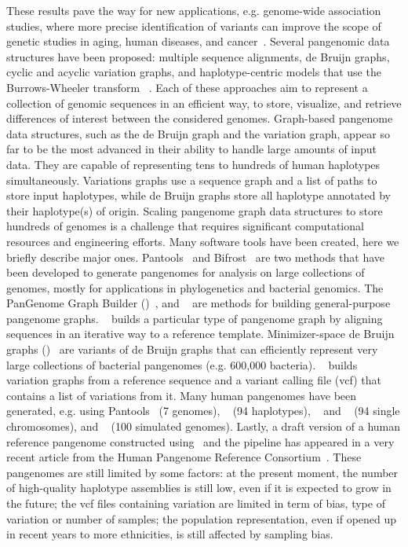 These results pave the way for new applications, e.g. genome-wide association studies, where more precise identification of variants can improve the scope of genetic studies in aging, human diseases, and cancer~\cite{computational_pangenomics, hpp}.
Several pangenomic data structures have been proposed: multiple sequence alignments, de Bruijn graphs, cyclic and acyclic variation graphs, and haplotype-centric models that use the Burrows-Wheeler transform ~\cite{computational_pangenomics}. Each of these approaches aim to represent a collection of genomic sequences in an efficient way, to store, visualize, and retrieve differences of interest between the considered genomes. 
Graph-based pangenome data structures, such as the de Bruijn graph and the variation graph, appear so far to be the most advanced in their ability to handle large amounts of input data. They are capable of representing tens to hundreds of human haplotypes simultaneously. Variations graphs use a sequence graph and a list of paths to store input haplotypes, while de Bruijn graphs store all haplotype \kmers annotated by their haplotype(s) of origin. 
Scaling pangenome graph data structures to store hundreds of genomes is a challenge that requires significant computational resources and engineering efforts. Many software tools have been created, here we briefly describe major ones.
Pantools~\cite{pantools} and Bifrost~\cite{bifrost} are two methods that have been developed to generate pangenomes for analysis on large collections of genomes, mostly for applications in phylogenetics and bacterial genomics. The PanGenome Graph Builder (\pggb)~\cite{pggb}, \mcactus and \twopaco~\cite{twopaco} are methods for building general-purpose pangenome graphs. \minigraph~\cite{minigraph} builds a particular type of pangenome graph by aligning sequences in an iterative way to a reference template. Minimizer-space de Bruijn graphs (\mdbg)~\cite{mdbg} are variants of de Bruijn graphs that can efficiently represent very large collections of bacterial pangenomes (e.g. 600,000 bacteria).  \mbox{\vg}~\mbox{\cite{vg}} builds variation graphs from a reference sequence and a variant calling file (vcf) that contains a list of variations from it.
Many human pangenomes have been generated, e.g. using Pantools~\cite{pantools} (7 genomes),  \minigraph~\cite{minigraph} (94 haplotypes), \mcactus~\cite{cactus,mcactus} and \pggb~\cite{hdpr} (94 single chromosomes), and \twopaco~\cite{twopaco} (100 simulated genomes). Lastly, a draft version of a human reference pangenome constructed using \pggb\ and the \mcactus pipeline has appeared in a very recent article from the Human Pangenome Reference Consortium~\cite{hdpr}.
These pangenomes are still limited by some factors: at the present moment, the number of high-quality haplotype assemblies is still low, even if it is expected to grow in the future; the vcf files containing variation are limited in term of bias, type of variation or number of samples; the population representation, even if opened up in recent years to more ethnicities, is still affected by sampling bias.


